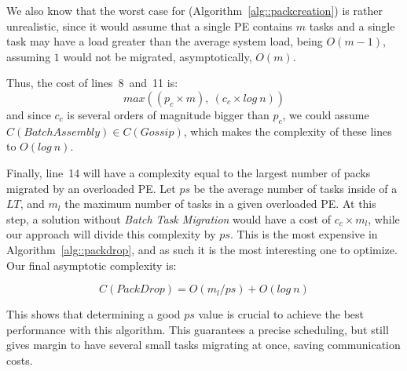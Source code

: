 We also know that the worst case for \batchassembly (Algorithm~\ref{alg::packcreation}) is rather unrealistic, 
since it would assume that a single PE contains $m$ tasks and a single task may have a load greater than the average system load, being $O(m-1)$, assuming $1$ would not be migrated, asymptotically, $O(m)$.

Thus, the cost of lines~8~and~11 is:
\begin{equation}
 max((p_c\times m),\ (c_c\times log\ n))
\end{equation}
and since $c_c$ is several orders of magnitude bigger than $p_c$, we could assume $C(BatchAssembly)\in C(Gossip)$, which makes the 
complexity of these lines to $O(log\ n)$.

Finally, line~14 will have a complexity equal to the largest number of packs migrated by an overloaded PE.
Let $ps$ be the average number of tasks inside of a $LT$, and $m_l$ the maximum number of tasks in a given overloaded PE.
At this step, a solution without \textit{Batch Task Migration} would have a cost of $c_c\times m_l$, while our approach will divide this complexity by $ps$. 
This is the most expensive in Algorithm~\ref{alg::packdrop}, and as such it is the most interesting one to optimize.
Our final asymptotic complexity is:

\begin{equation}
 C(PackDrop) = O(m_l/ps) + O(log\ n)
 \label{eq:worstcase}
\end{equation}

This shows that determining a good $ps$ value is crucial to achieve the best performance with this algorithm.
This guarantees a precise scheduling, but still gives margin to have several small tasks migrating at once, saving communication costs.

